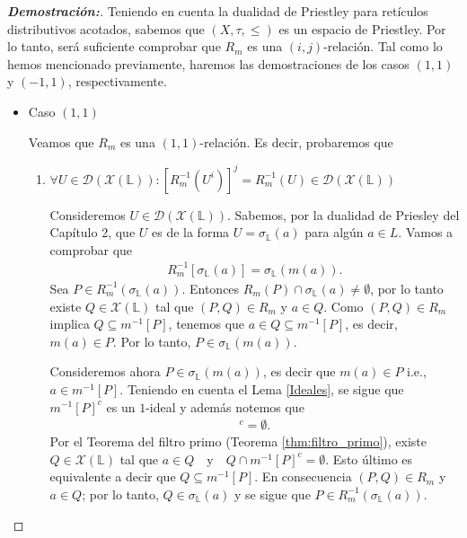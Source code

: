 \documentclass[12pt]{book}
\begin{document}
\begin{proof}[{\textbf{Demostración:}}]Teniendo en cuenta la dualidad de Priestley para retículos distributivos acotados, sabemos que $(X,\tau,\leq)$ es un espacio de Priestley. Por lo tanto, será suficiente comprobar que $R_m$ es una $(i,j)$-relación. Tal como lo hemos mencionado previamente, haremos las demostraciones de los casos $(1,1)$ y $(-1,1)$, respectivamente.\\

\vspace{0.2cm}

\begin{itemize}
    \item Caso $(1,1)$


Veamos que $R_m$ es una $(1,1)$-relación. Es decir, probaremos que
\begin{enumerate}
\item $\forall U\in \mathcal{D}(\mathcal{X}(\mathbb{L})): [R_m^{-1}(U^i)]^j = R_m^{-1}(U)\in \mathcal{D}(\mathcal{X}(\mathbb{L}))$

\vspace{0.2cm}

Consideremos $U \in \mathcal{D}(\mathcal{X}(\mathbb{L}))$. Sabemos, por la dualidad de Priesley del Capítulo 2, que $U$ es de la forma $U = \sigma_{\mathbb{L}}(a)$ para algún $a\in L$. Vamos a comprobar que
\begin{align*}
    R_m^{-1}[\sigma_{\mathbb{L}}(a)] = \sigma_{\mathbb{L}}(m(a)).
\end{align*}
Sea $P\in R_m^{-1}(\sigma_{\mathbb{L}}(a))$. Entonces $R_m(P)\cap \sigma_{\mathbb{L}}(a) \neq \emptyset$, por lo tanto existe $Q\in \mathcal{X}(\mathbb{L})$ tal que $(P,Q)\in R_m$ y $a\in Q$. Como $(P,Q)\in R_m$ implica $Q\subseteq m^{-1}[P]$, tenemos que  $a\in Q \subseteq m^{-1}[P]$, es decir, $m(a)\in P$. Por lo tanto, $P\in \sigma_{\mathbb{L}}(m(a))$.\\  

\vspace{0.2cm}

Consideremos ahora $P\in \sigma_{\mathbb{L}}(m(a))$, es decir que $m(a)\in P$ i.e., $a\in m^{-1}[P]$. Teniendo en cuenta el Lema \ref{Ideales}, se sigue que $m^{-1}[P]^c$ es un $1$-ideal y además notemos que 
\begin{align*}
      [a)\cap m^{-1}[P]^c = \emptyset.
\end{align*}
Por el Teorema del filtro primo (Teorema \ref{thm:filtro_primo}), existe $Q\in\mathcal{X}(\mathbb{L})$ tal que $a\in Q \quad \text{y} \quad Q\cap m^{-1}[P]^c = \emptyset$. Esto último es equivalente a decir que
$Q\subseteq m^{-1}[P]$. En consecuencia $(P,Q)\in R_m$ y $a\in Q$; por lo tanto, $Q\in \sigma_{\mathbb{L}}(a)$ y se sigue que $P\in R_m^{-1}(\sigma_{\mathbb{L}}(a))$. \\


\end{enumerate}
\end{itemize}
\end{proof}
\end{document}
